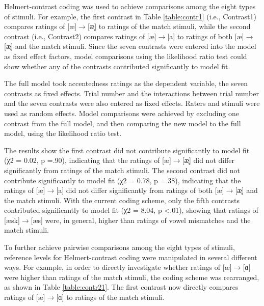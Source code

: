 Helmert-contrast coding was used to achieve comparisons among the eight types of stimuli. For example, the first contrast in Table \ref{table:contr1} (i.e., Contrast1) compares ratings of [æ]$\rightarrow$[æ̞] to ratings of the match stimuli, while the second contrast (i.e., Contrast2) compares ratings of [æ]$\rightarrow$[a] to ratings of both [æ]$\rightarrow$[æ̞] and the match stimuli. Since the seven contrasts were entered into the model as fixed effect factors, model comparisons using the likelihood ratio test could show whether any of the contrasts contributed significantly to model fit. 

The full model took accentedness ratings as the dependent variable, the seven contrasts as fixed effects. Trial number and the interactions between trial number and the seven contrasts were also entered as fixed effects. Raters and stimuli were used as random effects. Model comparisons were achieved by excluding one contrast from the full model, and then comparing the new model to the full model, using the likelihood ratio test. 

The results show the first contrast did not contribute significantly to model fit (χ2 = 0.02, p =.90), indicating that the ratings of [æ]$\rightarrow$[æ̞] did not differ significantly from ratings of the match stimuli. The second contrast did not contribute significantly to model fit (χ2 = 0.78, p =.38), indicating that the ratings of [æ]$\rightarrow$[a] did not differ significantly from ratings of both [æ]$\rightarrow$[æ̞] and the match stimuli. With the current coding scheme, only the fifth contrasts contributed significantly to model fit  (χ2 = 8.04, p <.01), showing that ratings of [æsk]$\rightarrow$[æs] were, in general, higher than ratings of vowel mismatches and the match stimuli. 

To further achieve pairwise comparisons among the eight types of stimuli, reference levels for Helmert-contrast coding were manipulated in several different ways. For example, in order to directly investigate whether ratings of [æ]$\rightarrow$[ɑ] were higher than ratings of the match stimuli, the coding scheme was rearranged, as shown in Table \ref{table:contr21}. The first contrast now directly compares ratings of [æ]$\rightarrow$[ɑ] to ratings of the match stimuli.

